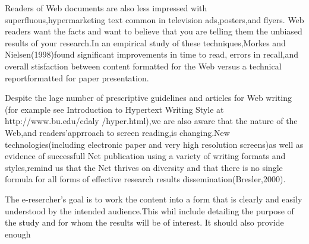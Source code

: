 \documentclass[10pt,a4paper]{book}
\begin{document}
Readers of Web documents are also less impressed with superfluous,hypermarketing text common in television ads,posters,and flyers. Web readers want the facts and want to believe that you are telling them the unbiased results of your research.In an empirical study of these techniques,Morkes and Nielsen(1998)found significant improvements in time to read, errors in recall,and overall stisfaction between content formatted for the Web versus a technical reportformatted for paper presentation.

Despite the lage number of prescriptive guidelines and articles for Web writing (for example see Introduction to Hypertext Writing Style at http://www.bu.edu/cdaly
/hyper.html),we are also aware that the nature of the Web,and readers'apprroach to screen reading,is changing.New technologies(including electronic paper and very high resolution screens)as well as evidence of successfull Net publication using a variety of writing formats and styles,remind us that the Net thrives on diversity and that there is no single formula for all forms of effective research results dissemination(Bresler,2000).

The e-resercher's goal is to work the content into a form that is clearly and easily understood by the intended audience.This whil include detailing the purpose of the study and for whom the results will be of interest. It should also provide enough
\end{document}
